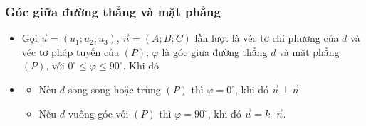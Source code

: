 \subsubsection{Góc giữa đường thẳng và mặt phẳng}
\begin{itemize}
	\item [\iconMT]   Gọi $\vec{u}=(u_1;u_2;u_3)$, $\vec{n}=(A;B;C)$ lần lượt là véc tơ chỉ phương của  $d$ và véc tơ pháp tuyến của $(P)$; $\varphi$ là góc giữa đường thẳng $d$ và mặt phẳng $(P)$, với $0^\circ \leq \varphi \leq 90^\circ$.
	Khi đó
	\item [\iconMT] 
	\begin{itemize}
		\item [$\bullet$] Nếu $d$ song song hoặc trùng $(P)$ thì $\varphi =0^\circ$, khi đó $\vec{u} \perp \vec{n}$
		\item [$\bullet$] Nếu $d$ vuông góc với $(P)$ thì $\varphi =90^\circ$, khi đó $\vec{u} =k \cdot \vec{n}$.
	\end{itemize}
\end{itemize}
\newpage
